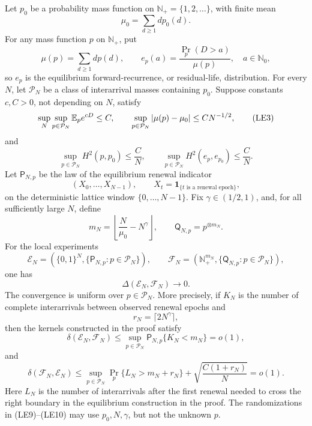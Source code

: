 \begin{theorem}
\label{thm:stationary-renewal-palm-equivalence-main}
Let \(p_0\) be a probability mass function on
\(\mathbb N_+=\{1,2,\ldots\}\), with finite mean
\[
 \mu_0=\sum_{d\ge1}d p_0(d).
\]
For any mass function \(p\) on \(\mathbb N_+\), put
\[
 \mu(p)=\sum_{d\ge1}d p(d),\qquad
 e_p(a)=\frac{\Pr_p(D>a)}{\mu(p)},\quad a\in\mathbb N_0,
\tag{LE2}
\]
so \(e_p\) is the equilibrium forward-recurrence, or residual-life,
distribution.  For every \(N\), let \(\mathcal P_N\) be a class of
interarrival masses containing \(p_0\).  Suppose constants \(c,C>0\), not
depending on \(N\), satisfy
\[
 \sup_N\sup_{p\in\mathcal P_N}\mathbb{E}_p e^{cD}\le C,
 \qquad
 \sup_{p\in\mathcal P_N}|\mu(p)-\mu_0|\le C N^{-1/2},
\tag{LE3}
\]
and
\[
 \sup_{p\in\mathcal P_N}H^2(p,p_0)\le \frac C N,
 \qquad
 \sup_{p\in\mathcal P_N}H^2(e_p,e_{p_0})\le \frac C N.
\tag{LE4}
\]
Let \(\mathsf P_{N,p}\) be the law of the equilibrium renewal indicator
\[
 (X_0,\ldots,X_{N-1}),\qquad
 X_t=\mathbf1_{\{t\text{ is a renewal epoch}\}},
\tag{LE5}
\]
on the deterministic lattice window \(\{0,\ldots,N-1\}\).  Fix
\(\gamma\in(1/2,1)\), and, for all sufficiently large \(N\), define
\[
 m_N=\left\lfloor\frac N{\mu_0}-N^\gamma\right\rfloor,
 \qquad \mathsf Q_{N,p}=p^{\otimes m_N}.
\tag{LE6}
\]
For the local experiments
\[
 \mathcal E_N=(\{0,1\}^N,\{\mathsf P_{N,p}:p\in\mathcal P_N\}),
 \qquad
 \mathcal F_N=(\mathbb N_+^{m_N},
               \{\mathsf Q_{N,p}:p\in\mathcal P_N\}),
\]
one has
\[
 \Delta(\mathcal E_N,\mathcal F_N)\longrightarrow0.
\tag{LE7}
\]
The convergence is uniform over \(p\in\mathcal P_N\).  More precisely, if
\(K_N\) is the number of complete interarrivals between observed renewal
epochs and
\[
 r_N=\lceil2N^\gamma\rceil,
\tag{LE8}
\]
then the kernels constructed in the proof satisfy
\[
 \delta(\mathcal E_N,\mathcal F_N)
 \le \sup_{p\in\mathcal P_N}
       \mathsf P_{N,p}\{K_N<m_N\}=o(1),
\tag{LE9}
\]
and
\[
 \delta(\mathcal F_N,\mathcal E_N)
 \le \sup_{p\in\mathcal P_N}
       \Pr_p\{L_N>m_N+r_N\}
       +\sqrt{\frac{C(1+r_N)}N}=o(1).
\tag{LE10}
\]
Here \(L_N\) is the number of interarrivals after the first renewal needed
to cross the right boundary in the equilibrium construction in the proof.
The randomizations in \textup{(LE9)}--\textup{(LE10)} may use
\(p_0,N,\gamma\), but not the unknown \(p\).


\end{theorem}

